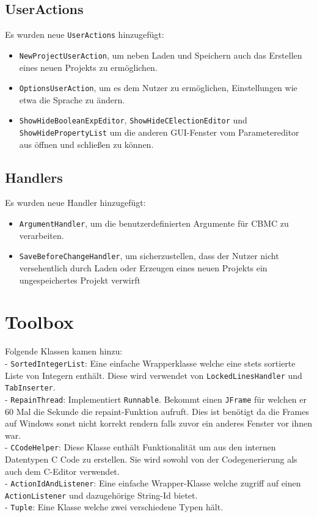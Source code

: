 \documentclass[a4paper]{scrreprt}
\begin{document}
\subsection{UserActions}
Es wurden neue \verb!UserActions! hinzugefügt:
\begin{itemize}
\item \verb!NewProjectUserAction!, um neben Laden und Speichern auch das Erstellen eines neuen Projekts zu ermöglichen.
\item \verb!OptionsUserAction!, um es dem Nutzer zu ermöglichen, Einstellungen wie etwa die Sprache zu ändern.
\item \verb!ShowHideBooleanExpEditor!, \verb!ShowHideCElectionEditor! und \verb!ShowHidePropertyList! um die anderen GUI-Fenster vom Parametereditor aus öffnen und schließen zu können.
\end{itemize}

\subsection{Handlers}
Es wurden neue Handler hinzugefügt:
\begin{itemize}
\item \verb!ArgumentHandler!, um die benutzerdefinierten Argumente für CBMC zu verarbeiten.
\item \verb!SaveBeforeChangeHandler!, um sicherzustellen, dass der Nutzer nicht versehentlich durch Laden oder Erzeugen eines neuen Projekts ein ungespeichertes Projekt verwirft
\end{itemize}

\section{Toolbox}
Folgende Klassen kamen hinzu:\\
- \verb!SortedIntegerList!: Eine einfache Wrapperklasse welche eine stets sortierte Liste von Integern enthält. Diese wird verwendet von \verb!LockedLinesHandler! und \verb!TabInserter!.\\
- \verb!RepainThread!: Implementiert \verb!Runnable!. Bekommt einen \verb!JFrame! für welchen er 60 Mal die Sekunde die repaint-Funktion aufruft. Dies ist benötigt da die Frames auf Windows sonst nicht korrekt rendern falls zuvor ein anderes Fenster vor ihnen war.\\
- \verb!CCodeHelper!: Diese Klasse enthält Funktionalität um aus den internen Datentypen C Code zu erstellen. Sie wird sowohl von der Codegenerierung als auch dem C-Editor verwendet. \\
- \verb!ActionIdAndListener!: Eine einfache Wrapper-Klasse welche zugriff auf einen \verb!ActionListener! und dazugehörige String-Id bietet.\\
- \verb!Tuple!: Eine Klasse welche zwei verschiedene Typen hält.
\end{document}
